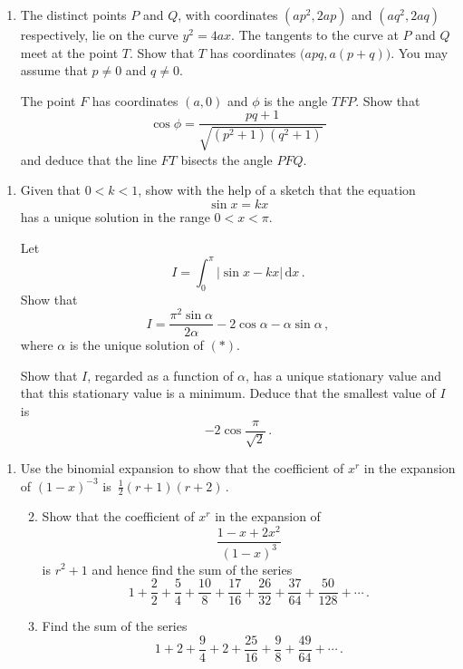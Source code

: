 \documentclass[a4, 11pt]{report}
\newlength{\qspace}
\newcounter{qnumber}
\newenvironment{question}%
 {\vspace{\qspace}
  \begin{enumerate}[\bfseries 1\quad][10]%
    \setcounter{enumi}{\value{qnumber}}%
    \item%
 }
{
  \end{enumerate}
  \filbreak
  \stepcounter{qnumber}
 }
\newenvironment{questionparts}[1][1]%
 {
  \begin{enumerate}[\bfseries (i)]%
    \setcounter{enumii}{#1}
    \addtocounter{enumii}{-1}
    \setlength{\itemsep}{5mm}
    \setlength{\parskip}{8pt}
 }
 {
  \end{enumerate}
 }
\def\d{{\mathrm d}}
\begin{document}
\begin{question}
The distinct points $P$ and $Q$, with coordinates $(ap^2,2ap)$
and $(aq^2,2aq)$ respectively, lie on the curve $y^2=4ax$. 
The tangents to the curve at $P$ and $Q$ meet at the point $T$.
Show that $T$ has coordinates $\big(apq, a(p+q)\big)$.
You may assume that $p\ne0$ and $q\ne0$.

The point $F$ has coordinates $(a,0)$ and $\phi$ is
the angle $TFP$. Show that 
\[
\cos\phi = \frac{pq+1}{\sqrt{(p^2+1)(q^2+1)}\ }
\]
and deduce that the line $FT$ bisects the angle $PFQ$. 
\end{question}

\begin{question}
Given that $0<k<1$, show with the help of a sketch that the equation
\[
\sin x = k x
\tag{$*$}\]
has a unique solution in the range $0<x<   \pi$. 

Let  
\[
I= \int_0^\pi \big\vert \sin x -kx\big\vert \, \d x\,.
\]
Show that
\[
I= \frac{\pi^2 \sin\alpha }{2\alpha} -2\cos\alpha - \alpha \sin\alpha\,,
\]
where 
$\alpha$ is the unique solution of $(*)$.

Show that $I$, regarded as a function of $\alpha$, has
a unique stationary value and that this stationary value
 is a minimum. Deduce that
the smallest value of $I$ is
\[
 -2 \cos \frac{\pi}{\sqrt2}\,
.\]
	\end{question}
	
\begin{question}
Use the binomial expansion to show that  the 
coefficient of $x^r$ in the expansion  of 
$(1-x)^{-3}$ is~$\frac12 (r+1)(r+2)\,$.

\begin{questionparts}
\item
Show that the coefficient of $x^r$ in the expansion of 
\[
\frac{1-x+2x^2}{(1-x)^3}
\]
is $r^2+1$ and hence find the sum of the series
\[
1+\frac22+\frac54+\frac{10}8+\frac{17}{16}+\frac{26}{32}+\frac{37}{64} 
+\frac{50}{128}+ \cdots \,.
\]
\item Find the sum of the series
\[
1+2+\frac94+2+\frac{25}{16}+\frac{9}{8}+\frac{49}{64} 
+ \cdots \,. 
\]

\end{questionparts} 
\end{question}
	
\end{document}

